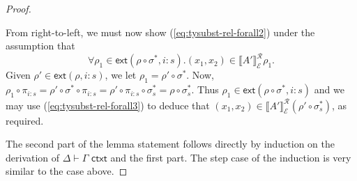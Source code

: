 \documentclass[natbib,preprint]{sigplanconf}
\newcommand{\isCtxt}{\textsf{ ctxt}}
\newcommand{\relEnv}[1]{\mathcal{#1}}
\newcommand{\rsem}[3]{\llbracket #1 \rrbracket^{\mathcal{R}}_{#2}{#3}}
\newcommand{\extends}[2]{\mathsf{ext}(#1,#2)}
\begin{document}
\begin{proof}
\begin{description}
    From right-to-left, we must now show
    (\ref{eq:tysubst-rel-forall2}) under the assumption that
    \begin{equation}
      \label{eq:tysubst-rel-forall3}
      \forall \rho_1 \in \extends{\rho \circ \sigma^*}{i:s}. (x_1,x_2) \in \rsem{A'}{\relEnv{E}}{\rho_1}.
    \end{equation}
    Given $\rho' \in \extends{\rho}{i:s}$, we let $\rho_1 = \rho'
    \circ \sigma^*$. Now, $\rho_1 \circ \pi_{i:s} = \rho' \circ
    \sigma^* \circ \pi_{i:s} = \rho' \circ \pi_{i:s} \circ \sigma_s^{*}
    = \rho \circ \sigma_s^{*}$. Thus $\rho_1 \in \extends{\rho \circ
      \sigma^*}{i:s}$ and we may use (\ref{eq:tysubst-rel-forall3}) to
    deduce that $(x_1,x_2) \in \rsem{A'}{\relEnv{E}}{(\rho' \circ \sigma_s^{*})}$,
    as required.
  \end{description}
  The second part of the lemma statement follows directly by induction
  on the derivation of $\Delta \vdash \Gamma \isCtxt$ and the first
  part. The step case of the induction is very similar to the
   case above.
\end{proof}
\end{document}
